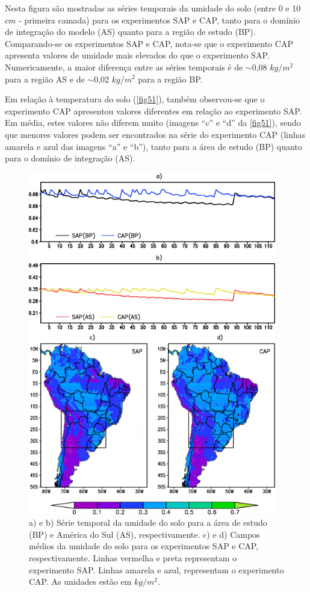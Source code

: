 Nesta figura são mostradas as séries temporais da umidade do solo (entre 0 e 10 $cm$ - primeira camada) para os experimentos SAP e CAP, tanto para o domínio de integração do modelo (AS) quanto para a região de estudo (BP). Comparando-se os experimentos SAP e CAP, nota-se que o experimento CAP apresenta valores de umidade mais elevados do que o experimento SAP. Numericamente, a maior diferença entre as séries temporais é de $\sim$0,08 $kg/m^{2}$ para a região AS e de $\sim$0,02 $kg/m^{2}$ para a região BP.

Em relação à temperatura do solo (\autoref{fig51}), também observou-se que o experimento CAP apresentou valores diferentes em relação ao experimento SAP. Em média, estes valores não diferem muito (imagens ``c'' e ``d'' da \autoref{fig51}), sendo que menores valores podem ser encontrados na série do experimento CAP (linhas amarela e azul das imagens ``a'' e ``b''), tanto para a área de estudo (BP) quanto para o domínio de integração (AS).

\begin{figure}[!hbp]
\centering
\includegraphics[height=15cm]{./figs/serie_umidade_solo-ANL-new.png}
\caption{a) e b) Série temporal da umidade do solo para a área de estudo (BP) e América do Sul (AS), respectivamente. c) e d) Campos médios da umidade do solo para os experimentos SAP e CAP, respectivamente. Linhas vermelha e preta representam o experimento SAP. Linhas amarela e azul, representam o experimento CAP. As unidades estão em $kg/m^{2}$.}
\label{fig50}
\end{figure}


